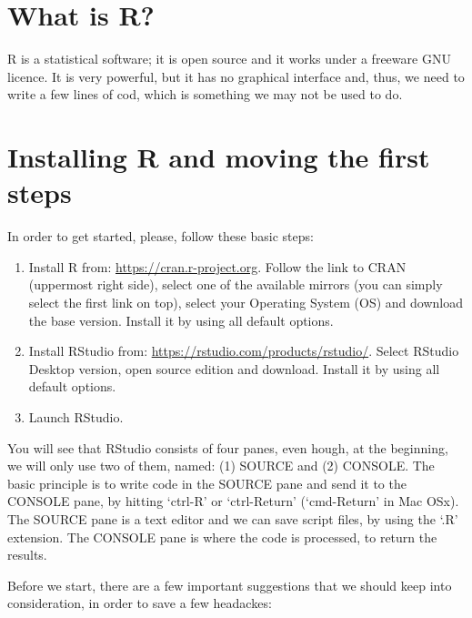 \documentclass[a4paper,12pt,oneside]{book}
\providecommand{\tightlist}{%
  \setlength{\itemsep}{0pt}\setlength{\parskip}{0pt}}
\begin{document}
\hypertarget{what-is-r}{%
\section{What is R?}\label{what-is-r}}

R is a statistical software; it is open source and it works under a freeware GNU licence. It is very powerful, but it has no graphical interface and, thus, we need to write a few lines of cod, which is something we may not be used to do.

\hypertarget{installing-r-and-moving-the-first-steps}{%
\section{Installing R and moving the first steps}\label{installing-r-and-moving-the-first-steps}}

In order to get started, please, follow these basic steps:

\begin{enumerate}
\def\labelenumi{\arabic{enumi}.}
\tightlist
\item
  Install R from: \url{https://cran.r-project.org}. Follow the link to CRAN (uppermost right side), select one of the available mirrors (you can simply select the first link on top), select your Operating System (OS) and download the base version. Install it by using all default options.
\item
  Install RStudio from: \url{https://rstudio.com/products/rstudio/}. Select RStudio Desktop version, open source edition and download. Install it by using all default options.
\item
  Launch RStudio.
\end{enumerate}

You will see that RStudio consists of four panes, even hough, at the beginning, we will only use two of them, named: (1) SOURCE and (2) CONSOLE. The basic principle is to write code in the SOURCE pane and send it to the CONSOLE pane, by hitting `ctrl-R' or `ctrl-Return' (`cmd-Return' in Mac OSx). The SOURCE pane is a text editor and we can save script files, by using the `.R' extension. The CONSOLE pane is where the code is processed, to return the results.

Before we start, there are a few important suggestions that we should keep into consideration, in order to save a few headackes:
\end{document}

